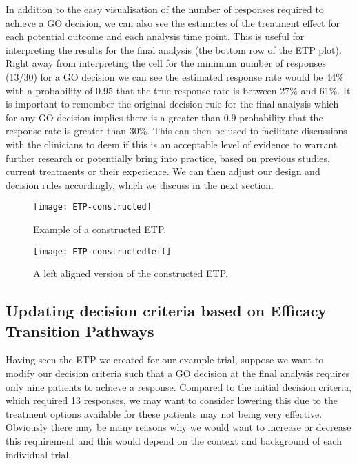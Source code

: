 In addition to the easy visualisation of the number of responses required to achieve a GO decision, we can also see the estimates of the treatment effect for each potential outcome and each analysis time point. This is useful for interpreting the results for the final analysis (the bottom row of the ETP plot). Right away from interpreting the cell for the minimum number of responses (13/30) for a GO decision we can see the estimated response rate would be 44\% with a probability of 0.95 that the true response rate is between 27\% and 61\%. It is important to remember the original decision rule for the final analysis which for any GO decision implies there is a greater than 0.9 probability that the response rate is greater than 30\%. This can then be used to facilitate discussions with the clinicians to deem if this is an acceptable level of evidence to warrant further research or potentially bring into practice, based on previous studies, current treatments or their experience. We can then adjust our design and decision rules accordingly, which we discuss in the next section. 

\begin{sidewaysfigure}
	\centering
	\caption{Example of a constructed ETP.}
	\label{fig_etp:ConstructedETP}
	\texttt{[image: ETP-constructed]}
\end{sidewaysfigure}

\begin{sidewaysfigure}
	\centering
	\caption{A left aligned version of the constructed ETP.}
	\label{fig_etp:ConstructedETPleft}
	\texttt{[image: ETP-constructedleft]}
\end{sidewaysfigure}

\newpage

\subsection{Updating decision criteria based on Efficacy Transition Pathways} 
\label{etp:updatingETPs}

Having seen the ETP we created for our example trial, suppose we want to modify our decision criteria such that a GO decision at the final analysis requires only nine patients to achieve a response. Compared to the initial decision criteria, which required 13 responses, we may want to  consider lowering this due to the treatment options available for these patients may not being very effective. Obviously there may be many reasons why we would want to increase or decrease this requirement and this would depend on the context and background of each individual trial.

